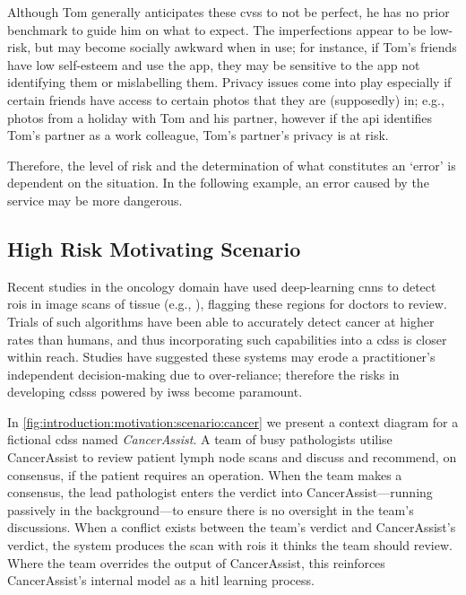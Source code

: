 Although Tom generally anticipates these \glspl{cvs} to not be perfect, he has no prior benchmark to guide him on what to expect. The imperfections appear to be low-risk, but may become socially awkward when in use; for instance, if Tom's friends have low self-esteem and use the app, they may be sensitive to the app not identifying them or mislabelling them. Privacy issues come into play especially if certain friends have access to certain photos that they are (supposedly) in; e.g., photos from a holiday with Tom and his partner, however if the \gls{api} identifies Tom's partner as a work colleague, Tom's partner's privacy is at risk.

Therefore, the level of risk and the determination of what constitutes an `error' is dependent on the situation. In the following example, an error caused by the service may be more dangerous.


\subsection{High Risk Motivating Scenario}
\label{ssec:introduction:motivation:scenario:cancer}

Recent studies in the oncology domain have used deep-learning \glspl{cnn} to detect \glspl{roi} in image scans of tissue (e.g., \citep{Liu:2018fa,Haenssle:2018bz,EhteshamiBejnordi:2017kq}), flagging these regions for doctors to review. Trials of such algorithms have been able to accurately detect cancer at higher rates than humans, and thus incorporating such capabilities into a \gls{cdss} is closer within reach.  Studies have suggested these systems may erode a practitioner's independent decision-making \citep{Jaspers:2011hy,Chambers:1991uh} due to over-reliance; therefore the risks in developing \glspl{cdss} powered by \glspl{iws} become paramount.

In \cref{fig:introduction:motivation:scenario:cancer} we present a context diagram for a fictional \gls{cdss} named \textit{CancerAssist}. A team of busy pathologists utilise CancerAssist to review patient lymph node scans and discuss and recommend, on consensus, if the patient requires an operation. When the team makes a consensus, the lead pathologist enters the verdict into CancerAssist---running passively in the background---to ensure there is no oversight in the team's discussions. When a conflict exists between the team's verdict and CancerAssist's verdict, the system produces the scan with \glspl{roi} it thinks the team should review. Where the team overrides the output of CancerAssist, this reinforces CancerAssist's internal model as a \gls{hitl} learning process.


